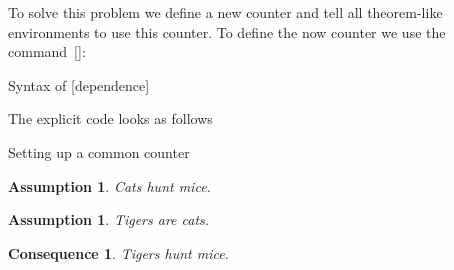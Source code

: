 To solve this problem we define a new counter  and tell all theorem-like environments to use this counter.
To define the now counter we use the command~[\comname]:
\begin{showcode}{Syntax of }
[dependence]
\end{showcode}
The explicit code looks as follows
\begin{showlatex}{Setting up a common counter}

\newtheorem{assumption}[alltheorems]{Assumption}
\newtheorem{consequence}[alltheorems]{Consequence}

\begin{assumption}
  Cats hunt mice.
\end{assumption}

\begin{assumption}
  Tigers are cats.
\end{assumption}

\begin{consequence}
  Tigers hunt mice.
\end{consequence}
\end{showlatex}

